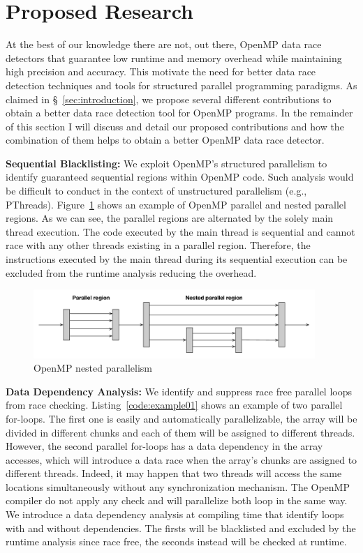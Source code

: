 \section{Proposed Research}
\label{sec:proposedresearch}

At the best of our knowledge there are not, out there, OpenMP data race
detectors that guarantee low runtime and memory overhead while maintaining
high precision and accuracy.
%
This motivate the need for better data race detection techniques and tools for
structured parallel programming paradigms.
%
As claimed in \S~\ref{sec:introduction}, we propose several different
contributions to obtain a better data race detection tool for OpenMP programs.
%
In the remainder of this section I will discuss and detail our proposed
contributions and how the combination of them helps to obtain a better OpenMP
data race detector.

\textbf{Sequential Blacklisting:} We exploit OpenMP's structured parallelism
to identify guaranteed sequential regions within OpenMP code.
%
Such analysis would be difficult to conduct in the context of unstructured
parallelism (e.g., PThreads).
%
Figure~\ref{fig:nested} shows an example of OpenMP parallel and nested
parallel regions.
%
As we can see, the parallel regions are alternated by the solely main thread
execution.
%
The code executed by the main thread is sequential and cannot race with any
other threads existing in a parallel region.
%
Therefore, the instructions executed by the main thread during its sequential
execution can be excluded from the runtime analysis reducing the overhead.

\begin{figure}
  \centering
  \includegraphics[width=0.95\textwidth]{figures/nested_parallelism}
  \caption{OpenMP nested parallelism}
  \label{fig:nested}
\end{figure}

\textbf{Data Dependency Analysis:} We identify and suppress race free parallel
loops from race checking.
%
Listing~\ref{code:example01} shows an example of two parallel for-loops.
%
The first one is easily and automatically parallelizable, the array will be
divided in different chunks and each of them will be assigned to different
threads.
%
However, the second parallel for-loops has a data dependency in the array
accesses, which will introduce a data race when the array's chunks are
assigned to different threads.
%
Indeed, it may happen that two threads will access the same locations
simultaneously without any synchronization mechanism.
%
The OpenMP compiler do not apply any check and will parallelize both loop in
the same way.
%
We introduce a data dependency analysis at compiling time that identify loops
with and without dependencies.
%
The firsts will be blacklisted and excluded by the runtime analysis since race
free, the seconds instead will be checked at runtime.

